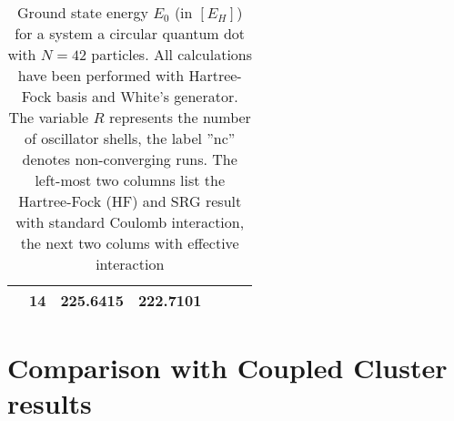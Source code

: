 \begin{table}
\begin{center}
\begin{tabular}{|c|c|c|c|c|c|c|}
& 14 &225.6415 &222.7101 & & & \\
\hline
\end{tabular}
\end{center}
\caption{Ground state energy $E_0$ (in $\left[E_H\right]$) for a system a circular quantum dot with $N=42$ particles. All calculations have been performed with Hartree-Fock basis and White's generator. The variable $R$ represents the number of oscillator shells, the label ''nc'' denotes non-converging runs. The left-most two columns list the Hartree-Fock (HF) and SRG result with standard Coulomb interaction, the next two colums with effective interaction}
\end{table}

\clearpage
\section{Comparison with Coupled Cluster results}

